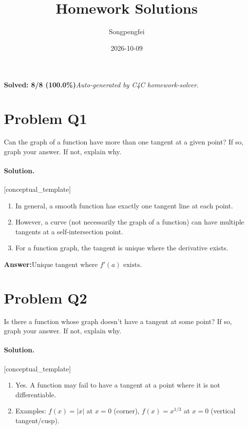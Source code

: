 \documentclass[11pt,a4paper]{article}
\title{Homework Solutions}
\author{Songpengfei}
\date{2026-10-09}
\newcommand{\solvertag}[1]{{\footnotesize\color{gray}\textsf{[#1]}}}
\begin{document}
\maketitle

\noindent\textbf{Solved: 8/8 (100.0\%)}\quad\textit{Auto-generated by C4C homework-solver.}

\section*{Problem Q1}
Can the graph of a function have more than one tangent at a given point? If so, graph your answer. If not, explain why.

\paragraph{Solution.} \solvertag{conceptual\_template} 

\begin{enumerate}[leftmargin=*]
  \item In general, a smooth function has exactly one tangent line at each point.
  \item However, a curve (not necessarily the graph of a function) can have multiple tangents at a self-intersection point.
  \item For a function graph, the tangent is unique where the derivative exists.
\end{enumerate}

\noindent\textbf{Answer:}\quad $\text{Unique tangent where } f'(a) \text{ exists.}$

\medskip

\section*{Problem Q2}
Is there a function whose graph doesn't have a tangent at some point? If so, graph your answer. If not, explain why.

\paragraph{Solution.} \solvertag{conceptual\_template} 

\begin{enumerate}[leftmargin=*]
  \item Yes. A function may fail to have a tangent at a point where it is not differentiable.
  \item Examples: $f(x) = |x|$ at $x = 0$ (corner), $f(x) = x^{1/3}$ at $x = 0$ (vertical tangent/cusp).
\end{enumerate}
\end{document}

